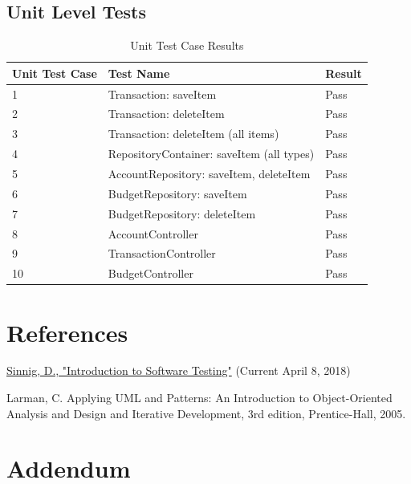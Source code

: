 \documentclass[12pt]{article}
\begin{document}
\subsection {Unit Level Tests}
\begin{table}[htbp]
\centering
\caption {Unit Test Case Results}
\label{test-result}
\begin{tabularx}{\textwidth}{ | l | X | l |}
\hline
\textbf{Unit Test Case}  &\textbf{Test Name}    &  \textbf{Result}                         \\ \hline
1 & Transaction: saveItem & Pass		 		\\ \hline
2 & Transaction: deleteItem & Pass 				\\ \hline
3 & Transaction: deleteItem (all items)& Pass 			\\ \hline
4 & RepositoryContainer: saveItem (all types) & Pass	 \\ \hline
5 & AccountRepository: saveItem, deleteItem & Pass		\\ \hline
6 & BudgetRepository: saveItem & Pass 			\\ \hline
7 & BudgetRepository: deleteItem & Pass 			\\ \hline
8 & AccountController & Pass					\\ \hline
9 & TransactionController & Pass					\\ \hline
10 & BudgetController & Pass					\\ \hline
\end{tabularx}
\end{table}

\section{References}
\href{https://users.encs.concordia.ca/~gregb/home/PDF/comp354-testing-intro.pdf}{Sinnig, D., "Introduction to Software Testing"} (Current April 8, 2018)

Larman, C. Applying UML and Patterns: An Introduction to Object-Oriented Analysis and Design and Iterative Development, 3rd edition, Prentice-Hall, 2005.

\section{Addendum}
\end{document}
